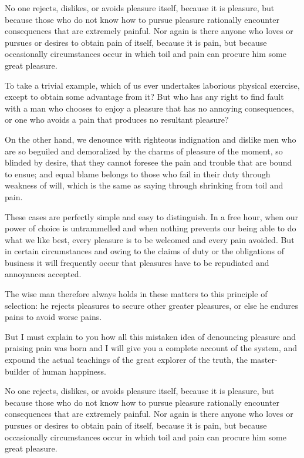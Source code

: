 No one rejects, dislikes, or avoids pleasure itself, because it is pleasure, but because those who do not know how to pursue pleasure rationally encounter consequences that are extremely painful. Nor again is there anyone who loves or pursues or desires to obtain pain of itself, because it is pain, but because occasionally circumstances occur in which toil and pain can procure him some great pleasure. 

To take a trivial example, which of us ever undertakes laborious physical exercise, except to obtain some advantage from it? But who has any right to find fault with a man who chooses to enjoy a pleasure that has no annoying consequences, or one who avoids a pain that produces no resultant pleasure?

On the other hand, we denounce with righteous indignation and dislike men who are so beguiled and demoralized by the charms of pleasure of the moment, so blinded by desire, that they cannot foresee the pain and trouble that are bound to ensue; and equal blame belongs to those who fail in their duty through weakness of will, which is the same as saying through shrinking from toil and pain.

These cases are perfectly simple and easy to distinguish. In a free hour, when our power of choice is untrammelled and when nothing prevents our being able to do what we like best, every pleasure is to be welcomed and every pain avoided. But in certain circumstances and owing to the claims of duty or the obligations of business it will frequently occur that pleasures have to be repudiated and annoyances accepted. 

The wise man therefore always holds in these matters to this principle of selection: he rejects pleasures to secure other greater pleasures, or else he endures pains to avoid worse pains.
\vfill
\stopcanonpage

\vfil\eject



\startcanonpage{24pc}
\typosize[11/13]
\noindent But I must explain to you how all this mistaken idea of denouncing pleasure and praising pain was born and I will give you a complete account of the system, and expound the actual teachings of the great explorer of the truth, the master-builder of human happiness. 

No one rejects, dislikes, or avoids pleasure itself, because it is pleasure, but because those who do not know how to pursue pleasure rationally encounter consequences that are extremely painful. Nor again is there anyone who loves or pursues or desires to obtain pain of itself, because it is pain, but because occasionally circumstances occur in which toil and pain can procure him some great pleasure. 

